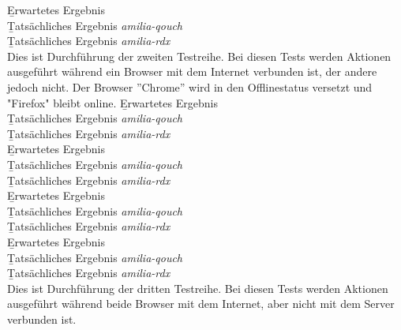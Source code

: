 %
\b{Erwartetes Ergebnis}\\
\b{Tatsächliches Ergebnis \it{amilia-qouch}}\\
\b{Tatsächliches Ergebnis \it{amilia-rdx}}\\
%
%
%
Dies ist Durchführung der zweiten Testreihe.
Bei diesen Tests werden Aktionen ausgeführt während ein Browser mit dem Internet verbunden ist, der andere jedoch nicht.
Der Browser ''Chrome'' wird in den Offlinestatus versetzt und "Firefox" bleibt online.
% 
\b{Erwartetes Ergebnis}\\
\b{Tatsächliches Ergebnis \it{amilia-qouch}}\\
\b{Tatsächliches Ergebnis \it{amilia-rdx}}\\
%
\b{Erwartetes Ergebnis}\\
\b{Tatsächliches Ergebnis \it{amilia-qouch}}\\
\b{Tatsächliches Ergebnis \it{amilia-rdx}}\\
%
\b{Erwartetes Ergebnis}\\
\b{Tatsächliches Ergebnis \it{amilia-qouch}}\\
\b{Tatsächliches Ergebnis \it{amilia-rdx}}\\
%
\b{Erwartetes Ergebnis}\\
\b{Tatsächliches Ergebnis \it{amilia-qouch}}\\
\b{Tatsächliches Ergebnis \it{amilia-rdx}}\\
%
%
%
Dies ist Durchführung der dritten Testreihe.
Bei diesen Tests werden Aktionen ausgeführt während beide Browser mit dem Internet, aber nicht mit dem Server verbunden ist.

